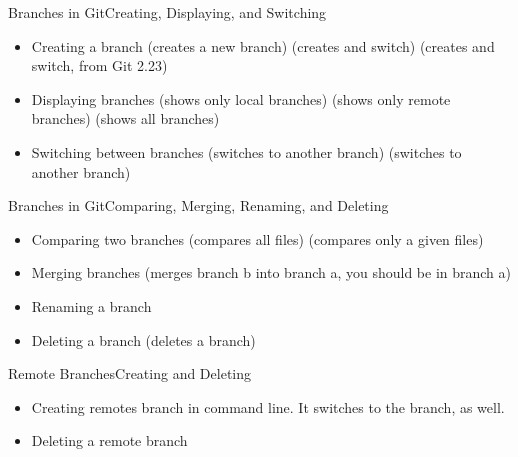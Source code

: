  \begin{frame}{Branches in Git}{Creating, Displaying, and Switching}
  \begin{itemize}
\item Creating a branch
   (creates a new branch)
   (creates and switch)
   (creates and switch, from Git 2.23)
\item Displaying branches
   (shows only local branches)
   (shows only remote branches)
   (shows all branches)
\item Switching between branches
   (switches to another branch)
   (switches to another branch)
\end{itemize}
\end{frame}

 \begin{frame}{Branches in Git}{Comparing, Merging, Renaming, and Deleting}
  \begin{itemize}
\item Comparing two branches
   (compares all files)
   (compares only a given files)
\item Merging branches
   (merges branch b into branch a, you should be in branch a)
\item Renaming a branch
\item Deleting a branch 
   (deletes a branch)
\end{itemize}
\end{frame}

\begin{frame}{Remote Branches}{Creating and Deleting}
  \begin{itemize}
\item Creating remotes branch in command line. It switches to the branch, as well.
\item Deleting a remote branch 
\end{itemize}
\end{frame}
